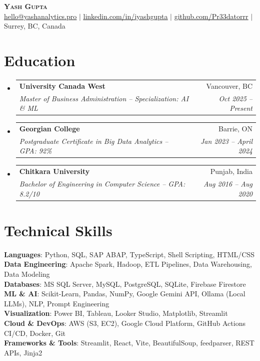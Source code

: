 \documentclass[letterpaper,11pt]{article}
\makeatletter
\newcommand{\resumeSubheading}[4]{
  \vspace{-2pt}\item
    \begin{tabular*}{0.97\textwidth}[t]{l@{\extracolsep{\fill}}r}
      \textbf{#1} & #2 \\
      \textit{\small#3} & \textit{\small #4} \\
    \end{tabular*}\vspace{-7pt}
}
\newcommand{\resumeSubHeadingListStart}{\begin{itemize}[leftmargin=0.15in, label={}]}
\newcommand{\resumeSubHeadingListEnd}{\end{itemize}}
\makeatother
\begin{document}
\begin{center}
    \textbf{\Huge \scshape Yash Gupta} \\ \vspace{1pt}
    \small
    \href{mailto:hello@yashanalytics.pro}{\underline{hello@yashanalytics.pro}} $|$
    \href{https://linkedin.com/in/iyashgupta}{\underline{linkedin.com/in/iyashgupta}} $|$
    \href{https://github.com/Pr33datorrr}{\underline{github.com/Pr33datorrr}} $|$
    Surrey, BC, Canada
\end{center}


\section{Education}
  \resumeSubHeadingListStart
    \resumeSubheading
      {University Canada West}{Vancouver, BC}
      {Master of Business Administration -- Specialization: AI \& ML}{Oct 2025 -- Present}
    \resumeSubheading
      {Georgian College}{Barrie, ON}
      {Postgraduate Certificate in Big Data Analytics -- GPA: 92\%}{Jan 2023 -- April 2024}
    \resumeSubheading
      {Chitkara University}{Punjab, India}
      {Bachelor of Engineering in Computer Science -- GPA: 8.2/10}{Aug 2016 -- Aug 2020}
  \resumeSubHeadingListEnd


\section{Technical Skills}
 \begin{itemize}[leftmargin=0.15in, label={}]
    \small{\item{
     \textbf{Languages}{: Python, SQL, SAP ABAP, TypeScript, Shell Scripting, HTML/CSS} \\
     \textbf{Data Engineering}{: Apache Spark, Hadoop, ETL Pipelines, Data Warehousing, Data Modeling} \\
     \textbf{Databases}{: MS SQL Server, MySQL, PostgreSQL, SQLite, Firebase Firestore} \\
     \textbf{ML \& AI}{: Scikit-Learn, Pandas, NumPy, Google Gemini API, Ollama (Local LLMs), NLP, Prompt Engineering} \\
     \textbf{Visualization}{: Power BI, Tableau, Looker Studio, Matplotlib, Streamlit} \\
     \textbf{Cloud \& DevOps}{: AWS (S3, EC2), Google Cloud Platform, GitHub Actions CI/CD, Docker, Git} \\
     \textbf{Frameworks \& Tools}{: Streamlit, React, Vite, BeautifulSoup, feedparser, REST APIs, Jinja2}
    }}
 \end{itemize}
\end{document}
